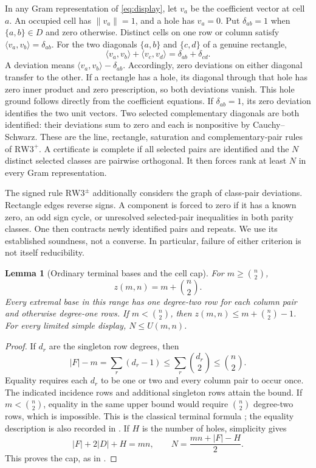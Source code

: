 \documentclass[11pt,a4paper]{article}
\newtheorem{lemma}[theorem]{Lemma}
\theoremstyle{definition}
\newcommand{\RW}{\mathrm{RW3}^{+}}
\newcommand{\SG}{\mathrm{RW3}^{\pm}}
\newcommand{\dd}{\delta}
\begin{document}
In any Gram representation of \eqref{eq:display}, let $v_a$ be the
coefficient vector at cell $a$. An occupied cell has $\|v_a\|=1$, and a
hole has $v_a=0$. Put $\dd_{ab}=1$ when $\{a,b\}\in D$ and zero
otherwise. Distinct cells on one row or column satisfy
$\langle v_a,v_b\rangle=\dd_{ab}$. For the two diagonals $\{a,b\}$ and
$\{c,d\}$ of a genuine rectangle,
\begin{equation}\label{eq:rectangle}
 \langle v_a,v_b\rangle+\langle v_c,v_d\rangle
       =\dd_{ab}+\dd_{cd}.
\end{equation}
A deviation means $\langle v_a,v_b\rangle-\dd_{ab}$.
Accordingly, zero deviations on either diagonal transfer to the other.
If a rectangle has a hole, its diagonal through that hole has zero
inner product and zero prescription, so both deviations vanish. This
hole ground follows directly from the coefficient equations.
If $\dd_{ab}=1$, its zero deviation identifies the two unit vectors.
Two selected complementary diagonals are both identified: their
deviations sum to zero and each is nonpositive by Cauchy--Schwarz.
These are the line, rectangle, saturation and complementary-pair rules
of $\RW$. A certificate is complete if all selected pairs are identified
and the $N$ distinct selected classes are pairwise orthogonal. It then
forces rank at least $N$ in every Gram representation.

The signed rule $\SG$ additionally considers the graph of class-pair
deviations. Rectangle edges reverse signs. A component is forced to zero
if it has a known zero, an odd sign cycle, or unresolved selected-pair
inequalities in both parity classes. One then contracts newly identified
pairs and repeats. We use its established soundness, not a converse.
In particular, failure of either criterion is not itself reducibility.

\begin{lemma}[Ordinary terminal bases and the cell cap]\label{lem:cap}
For $m\ge\binom n2$,
\begin{equation}\label{eq:ordinaryterminal}
 z(m,n)=m+\binom n2.
\end{equation}
Every extremal base in this range has one degree-two row for each column
pair and otherwise degree-one rows. If $m<\binom n2$, then
$z(m,n)\le m+\binom n2-1$. For every limited simple display,
$N\le U(m,n)$.
\end{lemma}
\begin{proof}
If $d_r$ are the singleton row degrees, then
\[
 |F|-m=\sum_r(d_r-1)\le\sum_r\binom{d_r}{2}\le\binom n2.
\]
Equality requires each $d_r$ to be one or two and every column pair to
occur once. The indicated incidence rows and additional singleton rows
attain the bound. If $m<\binom n2$, equality in the same upper
bound would require $\binom n2$ degree-two rows, which is impossible.
This is the classical terminal formula
\cite{Culik}; the equality description is also recorded in
\cite[Lemma~4.6]{XY}. If $H$ is the number of holes, simplicity gives
\begin{equation}\label{eq:cellidentity}
 |F|+2|D|+H=mn,
 \qquad N=\frac{mn+|F|-H}{2}.
\end{equation}
This proves the cap, as in \cite[Proposition~3.2]{LQ}.
\end{proof}
\end{document}
